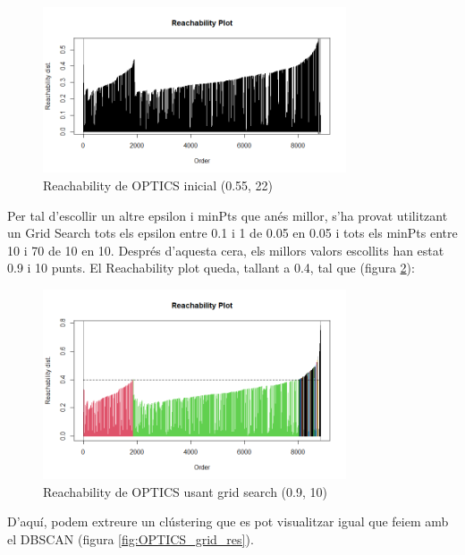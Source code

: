 \begin{figure}[H]
    \centering
    \includegraphics[width=0.8\textwidth]{Images/4_clustering/optics/reachability1.png}
    \caption{Reachability de OPTICS inicial (0.55, 22)}
    \label{fig:OPTICS_inicial}
\end{figure}

Per tal d'escollir un altre epsilon i minPts que anés millor, s'ha provat utilitzant un Grid Search tots els epsilon entre 0.1 i 1 de 0.05 en 0.05 i tots els minPts entre 10 i 70 de 10 en 10. Després d'aquesta cera, els millors valors escollits han estat 0.9 i 10 punts. El Reachability plot queda, tallant a 0.4, tal que (figura \ref{fig:OPTICS_grid}):

\begin{figure}[H]
    \centering
    \includegraphics[width=0.8\textwidth]{Images/4_clustering/optics/reachabilitygrid.png}
    \caption{Reachability de OPTICS usant grid search (0.9, 10)}
    \label{fig:OPTICS_grid}
\end{figure}

D'aquí, podem extreure un clústering que es pot visualitzar igual que feiem amb el DBSCAN (figura \ref{fig:OPTICS_grid_res}).


